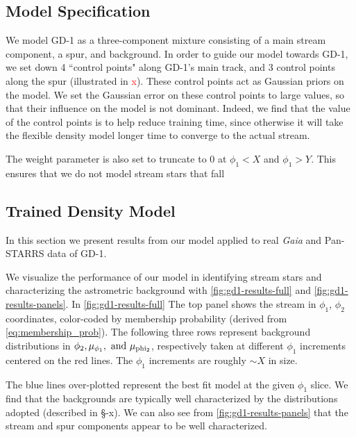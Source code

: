 \documentclass[twocolumn]{aastex631}
\newcommand{\TODO}[1]{{\textcolor{red}{#1}}}
\newcommand{\JN}[1]{\TODO{#1}}
\begin{document}
    \subsection{Model Specification}\label{sub:results_gd1:model}
    
        We model GD-1 as a three-component mixture consisting of a main stream
        component, a spur, and background. In order to guide our model towards
        GD-1, we set down 4 ``control points" along GD-1's main track, and 3
        control points along the spur (illustrated in \JN{x}). These control
        points act as Gaussian priors on the model. We set the Gaussian error on
        these control points to large values, so that their influence on the
        model is not dominant. Indeed, we find that the value of the control
        points is to help reduce training time, since otherwise it will take the
        flexible density model longer time to converge to the actual stream.

        The weight parameter is also set to truncate to $0$ at $\phi_1 < X$ and $\phi_1 > Y$. This ensures that we do not model stream stars that fall 
    
        
    \subsection{Trained Density Model}\label{sub:results_gd1:results}
    
        In this section we present results from our model applied to real {\it
        Gaia} and Pan-STARRS data of GD-1. 

        We visualize the performance of our model in identifying stream stars
        and characterizing the astrometric background with
        \autoref{fig:gd1-results-full} and \autoref{fig:gd1-results-panels}. In
        \autoref{fig:gd1-results-full} The top panel shows the stream in
        $\phi_1$, $\phi_2$ coordinates, color-coded by membership probability
        (derived from \autoref{eq:membership_prob}). The following three rows
        represent background distributions in $\phi_2, \mu_{\phi_1}, \rm{\ and}
        \ \mu_{\rm phi_2}$, respectively taken at different $\phi_1$ increments
        centered on the red lines. The $\phi_1$ increments are roughly $\sim X$
        in size.

        The blue lines over-plotted represent the best fit model at the given
        $\phi_1$ slice. We find that the backgrounds are typically well
        characterized by the distributions adopted (described in \S-x). We can
        also see from \autoref{fig:gd1-results-panels} that the stream and spur
        components appear to be well characterized. 
        
\end{document}
